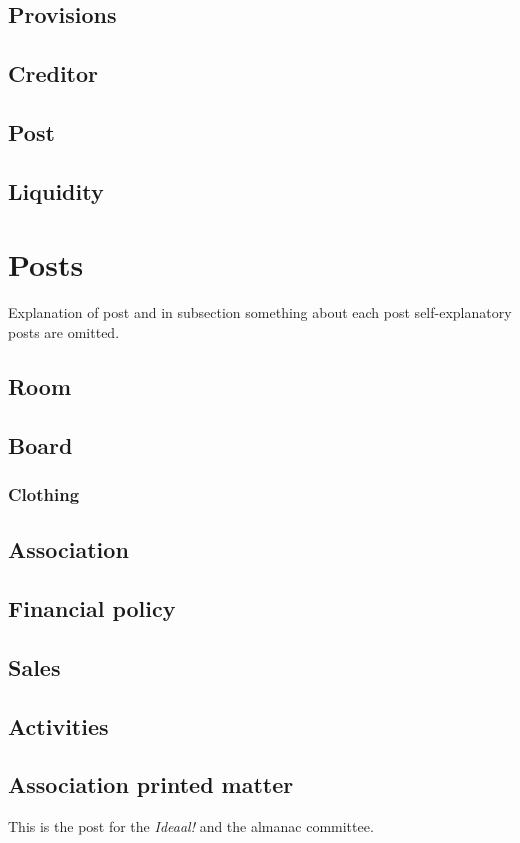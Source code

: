 \documentclass{report}
\begin{document}
\subsection{Provisions}
\subsection{Creditor}
\subsection{Post}
\subsection{Liquidity}
\section{Posts}
Explanation of post and in subsection something about each post
self-explanatory posts are omitted. 
\subsection{Room}
\subsection{Board}
\subsubsection{Clothing}
\subsection{Association}
\subsection{Financial policy}
\subsection{Sales}
\subsection{Activities}
\subsection{Association printed matter}
This is the post for the \textit{Ideaal!} and the almanac committee. 
\end{document}
